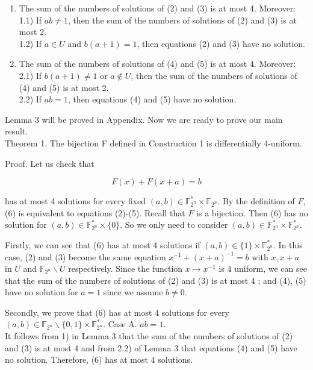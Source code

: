 \documentclass[10pt]{article}
\begin{document}
\begin{enumerate}
  \item The sum of the numbers of solutions of (2) and (3) is at most 4. Moreover:\\
1.1) If $a b \neq 1$, then the sum of the numbers of solutions of (2) and (3) is at most 2.\\
1.2) If $a \in U$ and $b(a+1)=1$, then equations (2) and (3) have no solution.
  \item The sum of the numbers of solutions of (4) and (5) is at most 4. Moreover:\\
2.1) If $b(a+1) \neq 1$ or $a \notin U$, then the sum of the numbers of solutions of (4) and (5) is at most 2.\\
2.2) If $a b=1$, then equations (4) and (5) have no solution.
\end{enumerate}

Lemma 3 will be proved in Appendix. Now we are ready to prove our main result.\\
Theorem 1. The bijection F defined in Construction 1 is differentially 4-uniform.

Proof. Let us check that


\begin{equation*}
F(x)+F(x+a)=b \tag{6}
\end{equation*}


has at most 4 solutions for every fixed $(a, b) \in \mathbb{F}_{2^{n}}^{*} \times \mathbb{F}_{2^{n}}$. By the definition of $F$, (6) is equivalent to equations (2)-(5). Recall that $F$ is a bijection. Then (6) has no solution for $(a, b) \in \mathbb{F}_{2^{n}}^{*} \times\{0\}$. So we only need to consider $(a, b) \in \mathbb{F}_{2^{n}}^{*} \times \mathbb{F}_{2^{n}}^{*}$.

Firstly, we can see that (6) has at most 4 solutions if $(a, b) \in\{1\} \times \mathbb{F}_{2^{n}}^{*}$. In this case, (2) and (3) become the same equation $x^{-1}+(x+a)^{-1}=b$ with $x, x+a$ in $U$ and $\mathbb{F}_{2^{n}} \backslash U$ respectively. Since the function $x \rightarrow x^{-1}$ is 4 uniform, we can see that the sum of the numbers of solutions of (2) and (3) is at most 4 ; and (4), (5) have no solution for $a=1$ since we assume $b \neq 0$.

Secondly, we prove that (6) has at most 4 solutions for every $(a, b) \in \mathbb{F}_{2^{n}} \backslash\{0,1\} \times \mathbb{F}_{2^{n}}^{*}$. Case A. $a b=1$.\\
It follows from 1) in Lemma 3 that the sum of the numbers of solutions of (2) and (3) is at most 4 and from 2.2) of Lemma 3 that equations (4) and (5) have no solution. Therefore, (6) has at most 4 solutions.
\end{document}
